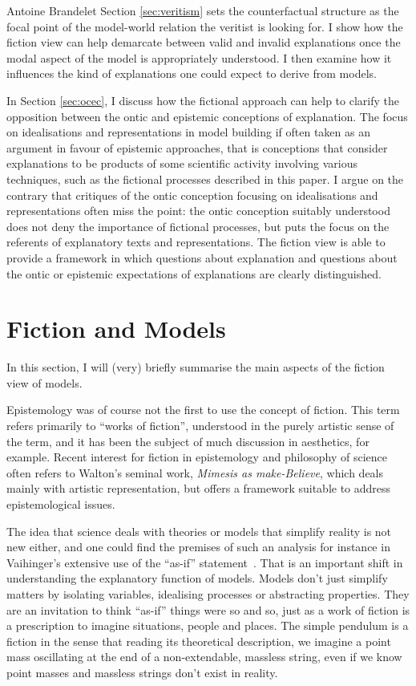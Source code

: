 \begin{artengenv}{Antoine Brandelet}
Section \ref{sec:veritism} sets the counterfactual structure as the focal point of the model-world relation the veritist is looking for. I show how the fiction view can help demarcate between valid and invalid explanations once the modal aspect of the model is appropriately understood. I then examine how it influences the kind of explanations one could expect to derive from models.

In Section \ref{sec:ocec}, I discuss how the fictional approach can help to clarify the opposition between the ontic and epistemic conceptions of explanation. The focus on idealisations and representations in model building if often taken as an argument in favour of epistemic approaches, that is conceptions that consider explanations to be products of some scientific activity involving various techniques, such as the fictional processes described in this paper. I argue on the contrary that critiques of the ontic conception focusing on idealisations and representations often miss the point: the ontic conception suitably understood does not deny the importance of fictional processes, but puts the focus on the referents of explanatory texts and representations. The fiction view is able to provide a framework in which questions about explanation and questions about the ontic or epistemic expectations of explanations are clearly distinguished.


\section{Fiction and Models}\label{sec:fiction}


In this section, I will (very) briefly summarise the main aspects of the fiction view of models.

Epistemology was of course not the first to use the concept of fiction. This term refers primarily to ``works of fiction'', understood in the purely artistic sense of the term, and it has been the subject of much discussion in aesthetics, for example. Recent interest for fiction in epistemology and philosophy of science often refers to Walton's seminal work, \textit{Mimesis as make-Believe}, which deals mainly with artistic representation, but offers a framework suitable to address epistemological issues.

The idea that science deals with theories or models that simplify reality is not new either, and one could find the premises of such an analysis for instance in Vaihinger's extensive use of the ``as-if'' statement~\parencite{Vaihinger1911eng}. That is an important shift in understanding the explanatory function of models. Models don't just simplify matters by isolating variables, idealising processes or abstracting properties. They are an invitation to think ``as-if'' things were so and so, just as a work of fiction is a prescription to imagine situations, people and places. The simple pendulum is a fiction in the sense that reading its theoretical description, we imagine a point mass oscillating at the end of a non-extendable, massless string, even if we know point masses and massless strings don't exist in reality.


\end{artengenv}
